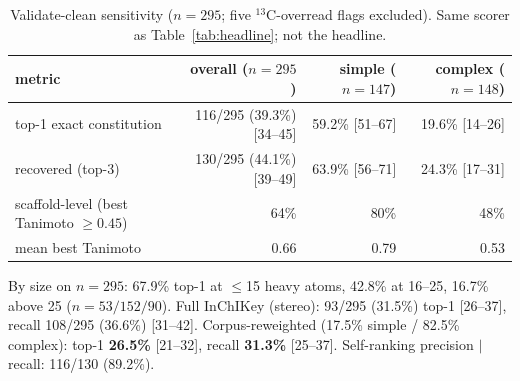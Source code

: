 \documentclass{article}
\begin{document}
\begin{table}[h]
\caption{Validate-clean sensitivity ($n{=}295$; five $^{13}$C-overread flags excluded).
Same scorer as Table~\ref{tab:headline}; not the headline.}
\label{tab:clean295}
\centering
\scriptsize
\setlength{\tabcolsep}{3pt}
\begin{tabular}{@{}lrrr@{}}
\toprule
metric & overall ($n{=}295$) & simple ($n{=}147$) & complex ($n{=}148$) \\
\midrule
top-1 exact constitution & 116/295 (39.3\%) [34--45] & 59.2\% [51--67] & 19.6\% [14--26] \\
recovered (top-3) & 130/295 (44.1\%) [39--49] & 63.9\% [56--71] & 24.3\% [17--31] \\
scaffold-level (best Tanimoto $\geq 0.45$) & 64\% & 80\% & 48\% \\
mean best Tanimoto & 0.66 & 0.79 & 0.53 \\
\bottomrule
\end{tabular}
\end{table}

By size on $n{=}295$: 67.9\% top-1 at $\leq$15 heavy atoms, 42.8\% at 16--25, 16.7\% above 25
($n{=}53/152/90$).
Full InChIKey (stereo): 93/295 (31.5\%) top-1 [26--37], recall 108/295 (36.6\%) [31--42].
Corpus-reweighted (17.5\% simple / 82.5\% complex): top-1 \textbf{26.5\%} [21--32], recall
\textbf{31.3\%} [25--37].
Self-ranking precision $|$ recall: 116/130 (89.2\%).
\end{document}
